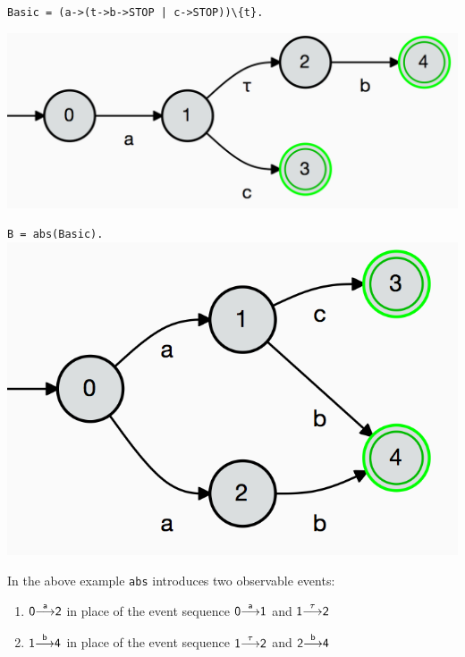\documentclass[]{article}
\begin{document}
\begin{minipage}{0.45\textwidth}
\noindent\begin{center}\verb$Basic = (a->(t->b->STOP | c->STOP))\{t}.$

 \includegraphics[scale=0.4]{BasicTau.png}
 \end{center}
 \end{minipage}\hspace{\fill}
\begin{minipage}{0.45\textwidth}
\noindent\begin{center}
\verb$B = abs(Basic).$
 \includegraphics[scale=0.6]{Basic.png}
 \end{center}
 \end{minipage}

 In the above example \verb|abs| introduces two observable events:
\begin{center}
 \begin{minipage}{0.7\textwidth}
 \begin{enumerate}
 \item ${\sf {0}{\stackrel{a}{\longrightarrow}}{2} }$  in place of  the event sequence ${\sf {0}{\stackrel{a}{\longrightarrow}}{1} }$  and  ${\sf {1}{\stackrel{\tau}{\longrightarrow}}{2} } $
 \item ${\sf {1}{\stackrel{b}{\longrightarrow}}{4} }$  in place of  the event sequence ${\sf {1}{\stackrel{\tau}{\longrightarrow}}{2} }$  and  ${\sf {2}{\stackrel{b}{\longrightarrow}}{4} } $
 \end{enumerate}
   \end{minipage}
 \end{center}
\end{document}
